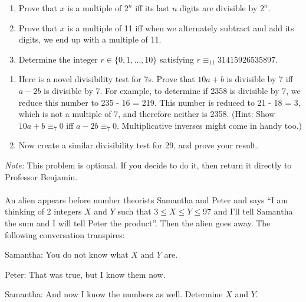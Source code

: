 \documentclass[12pt,letterpaper]{hmcpset}
\newenvironment{dialog}{\description}{\enddescription}
\begin{document}
\begin{problem}[6]
    \begin{enumerate}
        \item Prove that $x$ is a multiple of $2^n$ iff its last $n$ digits are divisible by $2^n$.
        \item Prove that $x$ is a multiple of 11 iff when we alternately subtract and add its digits, we end up with a multiple of 11.
        \item Determine the integer $r\in\{0,1,\ldots,10\}$ satisfying $r\equiv_{11}31415926535897$.
    \end{enumerate}
\end{problem}
\begin{solution}
    \vfill
\end{solution}
\newpage

\begin{problem}[7]
    \begin{enumerate}
        \item Here is a novel divisibility test for 7s. Prove that $10a+b$ is divisible by 7 iff $a-2b$ is divisible by 7. For example, to determine if 2358 is divisible by 7, we reduce this number to 235 - 16 = 219. This number is reduced to 21 - 18 = 3, which is not a multiple of 7, and therefore neither is 2358. (Hint: Show $10a + b \equiv_7 0$ iff $a - 2b \equiv_7 0$. Multiplicative inverses might come in handy too.)
        \item Now create a similar divisibility test for 29, and prove your result.
    \end{enumerate}
\end{problem}
\begin{solution}
    \vfill
\end{solution}
\newpage

\begin{problem}
\textit{Note:} This problem is optional. If you decide to do it, then return it directly to Professor Benjamin.\\\\
An alien appears before number theorists Samantha and Peter and says ``I am thinking of 2 integers $X$ and $Y$ such that $3\leq X\leq Y\leq97$ and I'll tell Samantha the sum and I will tell Peter the product''. Then the alien goes away. The following conversation transpires:
\begin{dialog}
    \item Samantha: You do not know what $X$ and $Y$ are.
    \item Peter: That was true, but I know them now.
    \item Samantha: And now I know the numbers as well.
\end{dialog}
Determine $X$ and $Y$.
\end{problem}
\begin{solution}
    \vfill
\end{solution}
\end{document}
